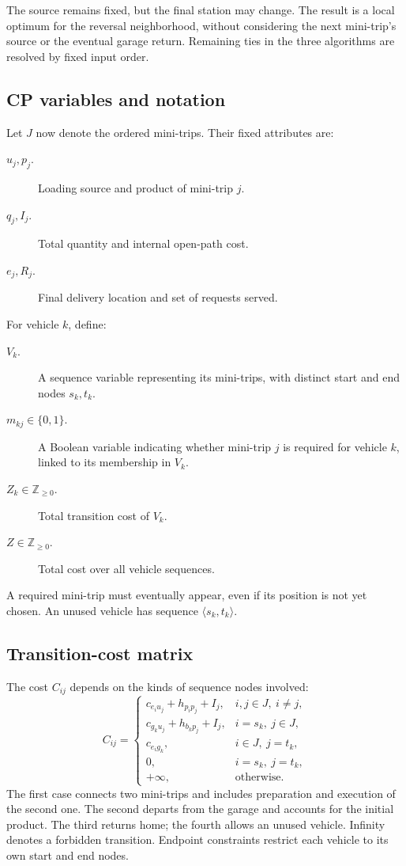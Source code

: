 The source remains fixed, but the final station may change. The result is a
local optimum for the reversal neighborhood, without considering the next
mini-trip's source or the eventual garage return. Remaining ties in the three
algorithms are resolved by fixed input order.

\subsection{CP variables and notation}
Let $J$ now denote the ordered mini-trips. Their fixed attributes are:
\begin{description}
\item[$u_j,p_j$.] Loading source and product of mini-trip $j$.
\item[$q_j,I_j$.] Total quantity and internal open-path cost.
\item[$e_j,R_j$.] Final delivery location and set of requests served.
\end{description}
For vehicle $k$, define:
\begin{description}
\item[$V_k$.] A sequence variable representing its mini-trips, with distinct
start and end nodes $s_k,t_k$.
\item[$m_{kj}\in\{0,1\}$.] A Boolean variable indicating whether mini-trip
$j$ is required for vehicle $k$, linked to its membership in $V_k$.
\item[$Z_k\in\mathbb{Z}_{\geq0}$.] Total transition cost of $V_k$.
\item[$Z\in\mathbb{Z}_{\geq0}$.] Total cost over all vehicle sequences.
\end{description}
A required mini-trip must eventually appear, even if its position is not yet
chosen. An unused vehicle has sequence $\langle s_k,t_k\rangle$.

\subsection{Transition-cost matrix}
The cost $C_{ij}$ depends on the kinds of sequence nodes involved:
\begin{equation}
C_{ij}=\begin{cases}
c_{e_i u_j}+h_{p_i p_j}+I_j,&i,j\in J,\ i\neq j,\\
c_{g_k u_j}+h_{b_k p_j}+I_j,&i=s_k,\ j\in J,\\
c_{e_i g_k},&i\in J,\ j=t_k,\\
0,&i=s_k,\ j=t_k,\\
+\infty,&\text{otherwise}.
\end{cases}
\label{eq:cp-transition-matrix}
\end{equation}
The first case connects two mini-trips and includes preparation and execution
of the second one. The second departs from the garage and accounts for the
initial product. The third returns home; the fourth allows an unused vehicle.
Infinity denotes a forbidden transition. Endpoint constraints restrict each
vehicle to its own start and end nodes.

